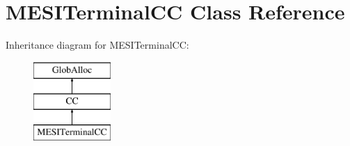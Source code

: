 \hypertarget{classMESITerminalCC}{\section{M\-E\-S\-I\-Terminal\-C\-C Class Reference}
\label{classMESITerminalCC}
}
Inheritance diagram for M\-E\-S\-I\-Terminal\-C\-C\-:\begin{figure}[H]
\begin{center}
\leavevmode
\includegraphics[height=3.000000cm]{classMESITerminalCC}
\end{center}
\end{figure}
